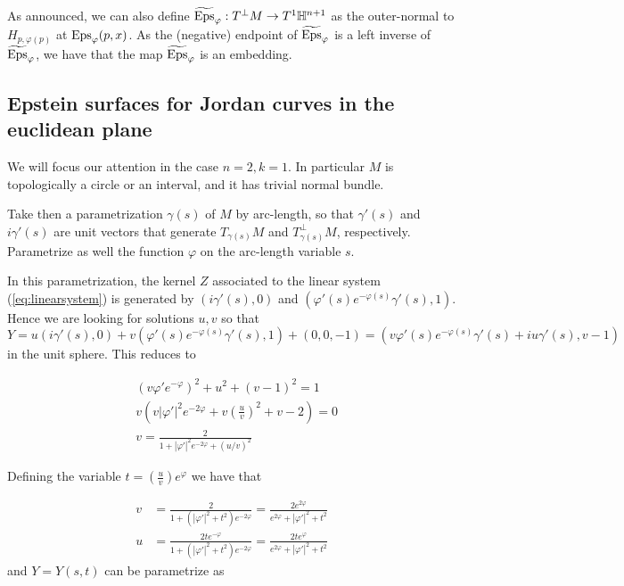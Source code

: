 \documentclass[12pt]{amsart}
\newcommand{\HH}{\mathbb{H}}
\newcommand{\Eps}{{\rm Eps}}
\begin{document}
As announced, we can also define $\widetilde{\Eps}_{\varphi}:T^\perp M \rightarrow T^1\HH^{n+1}$ as the outer-normal to $H_{p,\varphi(p)}$ at $\Eps_{\varphi}(p,x)$. As the (negative) endpoint of $\widetilde{\Eps}_{\varphi}$ is a left inverse of $\widetilde{\Eps}_{\varphi}$, we have that the map $\widetilde{\Eps}_{\varphi}$ is an embedding.




\subsection{Epstein surfaces for Jordan curves in the euclidean plane}\label{subsec:2dEps}

We will focus our attention in the case $n=2, k=1$. In particular $M$ is topologically a circle or an interval, and it has trivial normal bundle.

Take then a parametrization $\gamma(s)$ of $M$ by arc-length, so that $\gamma'(s)$ and $i\gamma'(s)$ are unit vectors that generate $T_{\gamma(s)}M$ and $T^\perp_{\gamma(s)} M$, respectively. Parametrize as well the function $\varphi$ on the arc-length variable $s$.

In this parametrization, the kernel $Z$ associated to the linear system (\ref{eq:linearsystem}) is generated by $(i\gamma'(s),0)$ and $(\varphi'(s)e^{-\varphi(s)}\gamma'(s),1)$. Hence we are looking for solutions $u,v$ so that $Y= u(i\gamma'(s),0) + v(\varphi'(s)e^{-\varphi(s)}\gamma'(s),1) + (0,0,-1) = (v\varphi'(s)e^{-\varphi(s)}\gamma'(s) + iu\gamma'(s), v-1)$ in the unit sphere. This reduces to

\begin{align*}
    &(v\varphi'e^{-\varphi})^2 + u^2 + (v-1)^2=1\\
    &v\left(v|\varphi'|^2e^{-2\varphi} + v\left(\frac{u}{v}\right)^2 + v-2\right)=0\\
    &v = \frac{2}{1+|\varphi'|^2e^{-2\varphi} + (u/v)^2}
\end{align*}

Defining the variable $t= \left(\frac{u}{v}\right)e^{\varphi}$ we have that

\begin{align*}
    v&= \frac{2}{1+(|\varphi'|^2+t^2)e^{-2\varphi}} = \frac{2e^{2\varphi}}{e^{2\varphi}+|\varphi'|^2+t^2}\\
    u&= \frac{2te^{-\varphi}}{1+(|\varphi'|^2+t^2)e^{-2\varphi}} = \frac{2te^{\varphi}}{e^{2\varphi}+|\varphi'|^2+t^2}
\end{align*}
and $Y=Y(s,t)$ can be parametrize as
\end{document}
